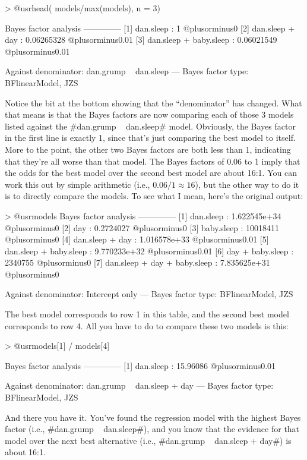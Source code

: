 \begin{rblock1}
> @usr{head( models/max(models), n = 3)}

Bayes factor analysis
--------------
[1] dan.sleep              : 1          @plusorminus0%
[2] dan.sleep + day        : 0.06265328 @plusorminus0.01%
[3] dan.sleep + baby.sleep : 0.06021549 @plusorminus0.01%

Against denominator:
  dan.grump ~ dan.sleep 
---
Bayes factor type: BFlinearModel, JZS
\end{rblock1}
Notice the bit at the bottom showing that the ``denominator'' has changed. What that means is that the Bayes factors are now comparing each of those 3 models listed against the \rtextverb#dan.grump ~ dan.sleep# model. Obviously, the Bayes factor in the first line is exactly 1, since that's just comparing the best model to itself. More to the point, the other two Bayes factors are both less than 1, indicating that they're all worse than that model. The Bayes factors of 0.06 to 1 imply that the odds for the best model over the second best model are about 16:1. You can work this out by simple arithmetic (i.e., $0.06 / 1 \approx 16$), but the other way to do it is to directly compare the models. To see what I mean, here's the original output:

\begin{rblock1}
> @usr{models}
Bayes factor analysis
--------------
[1] dan.sleep                    : 1.622545e+34 @plusorminus0%
[2] day                          : 0.2724027    @plusorminus0%
[3] baby.sleep                   : 10018411     @plusorminus0%
[4] dan.sleep + day              : 1.016578e+33 @plusorminus0.01%
[5] dan.sleep + baby.sleep       : 9.770233e+32 @plusorminus0.01%
[6] day + baby.sleep             : 2340755      @plusorminus0%
[7] dan.sleep + day + baby.sleep : 7.835625e+31 @plusorminus0%

Against denominator:
  Intercept only 
---
Bayes factor type: BFlinearModel, JZS
\end{rblock1}
The best model corresponds to row 1 in this table, and the second best model corresponds to row 4. All you have to do to compare these two models is this:

\begin{rblock1}
> @usr{models[1] / models[4]}

Bayes factor analysis
--------------
[1] dan.sleep : 15.96086 @plusorminus0.01%

Against denominator:
  dan.grump ~ dan.sleep + day 
---
Bayes factor type: BFlinearModel, JZS
\end{rblock1}
And there you have it. You've found the regression model with the highest Bayes factor (i.e., \rtextverb#dan.grump ~ dan.sleep#), and you know that the evidence for that model over the next best alternative (i.e., \rtextverb#dan.grump ~ dan.sleep + day#) is about 16:1.


